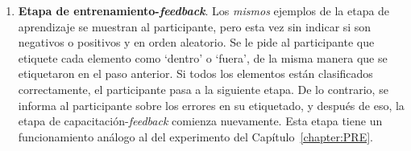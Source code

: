 \begin{enumerate}
    \item {\bf Etapa de entrenamiento-{\em feedback}}. Los {\em mismos} ejemplos de la etapa de aprendizaje se muestran al participante, pero esta vez sin indicar si son negativos o positivos y en orden aleatorio. Se le pide al participante que etiquete cada elemento como `dentro' o `fuera', de la misma manera que se etiquetaron en el paso anterior. Si todos los elementos están clasificados correctamente, el participante pasa a la siguiente etapa. De lo contrario, se informa al participante sobre los errores en su etiquetado, y después de eso, la etapa de capacitación-{\em feedback} comienza nuevamente. Esta etapa tiene un funcionamiento análogo al del experimento del Capítulo~\ref{chapter:PRE}. 



\end{enumerate}
